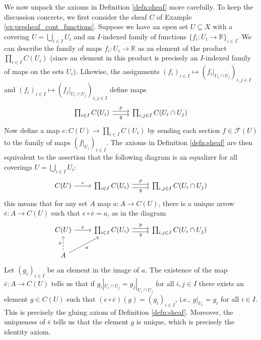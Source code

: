 \documentclass[10pt,oneside]{book}
\def\~#1{\mathscr{#1}}
\newcommand{\R}{\mathbb{R}}
\theoremstyle{plain}
\theoremstyle{definition}
\theoremstyle{remark}
\numberwithin{equation}{section}
\numberwithin{figure}{section}
\begin{document}
We now unpack the axioms in Definition \ref{defn:sheaf} more carefully. To keep the discussion concrete, we first consider the sheaf $C$ of Example \ref{ex:presheaf_cont_functions}. Suppose we have an open set $U \subseteq X$ with a covering $U = \bigcup_{i \in I} U_i$ and an $I$-indexed family of functions $\{f_i: U_i \to \R\}_{i \in I}$. We can describe the family of maps $f_i: U_i \to \R$ as an element of the product $\prod_{i \in I}C(U_i)$ (since an element in this product is precisely an $I$-indexed family of maps on the sets $U_i$). Likewise, the assignments $\left(f_i\right)_{i \in I} \mapsto \left(f_i|_{U_i \cap U_j}\right)_{i, j \in I}$ and $\left(f_i\right)_{i \in I} \mapsto \left(f_j|_{U_i \cap U_j}\right)_{i, j \in I}$ define maps
\[\begin{tikzcd}
    {\prod_{i \in I}C(U_i)} & {\prod_{i,j \in I} C(U_i \cap U_j)}
    \arrow["p", shift left, from=1-1, to=1-2]
    \arrow["q"', shift right, from=1-1, to=1-2]
\end{tikzcd}\]
Now define a map $e: C(U) \to \prod_{i \in I} C(U_i)$ by sending each section $f \in \~F(U)$ to the family of maps $\left(f|_{U_i}\right)_{i \in I}$. The axioms in Definition \ref{defn:sheaf} are then equivalent to the assertion that the following diagram is an equalizer for all coverings $U = \bigcup_{i \in I} U_i$:
\begin{equation}\label{eq:sheaf_equalizer1}\begin{tikzcd}
    {C(U)} & {\prod_{i \in I}C(U_i)} & {\prod_{i,j \in I} C(U_i \cap U_j)}
    \arrow["e", from=1-1, to=1-2]
    \arrow["p", shift left, from=1-2, to=1-3]
    \arrow["q"', shift right, from=1-2, to=1-3]
\end{tikzcd}\end{equation}
this means that for any set $A$ map $a: A \to C(U)$, there is a unique arrow $\bar{e}: A \to C(U)$ such that $e \circ \bar{e} = a$, as in the diagram
\[\begin{tikzcd}
    {C(U)} & {\prod_{i \in I}C(U_i)} & {\prod_{i,j \in I} C(U_i \cap U_j)} \\
    A
    \arrow["e", from=1-1, to=1-2]
    \arrow["p", shift left, from=1-2, to=1-3]
    \arrow["q"', shift right, from=1-2, to=1-3]
    \arrow["{\bar{e}}", dashed, from=2-1, to=1-1]
    \arrow["a"', from=2-1, to=1-2]
\end{tikzcd}\]
Let $(g_i)_{i \in I}$ be an element in the image of $a$. The existence of the map $\bar{e}: A \to C(U)$ tells us that if $g_i|_{U_i \cap U_j} = g_j|_{U_i \cap U_j}$ for all $i, j \in I$ there exists an element $g \in C(U)$ such that $(e \circ \bar{e})(g) = (g_i)_{i \in I}$, i.e., $g|_{U_i} = g_i$ for all $i \in I$. This is precisely the gluing axiom of Definition \ref{defn:sheaf}. Moreover, the uniqueness of $\bar{e}$ tells us that the element $g$ is unique, which is precisely the identity axiom.
\end{document}
